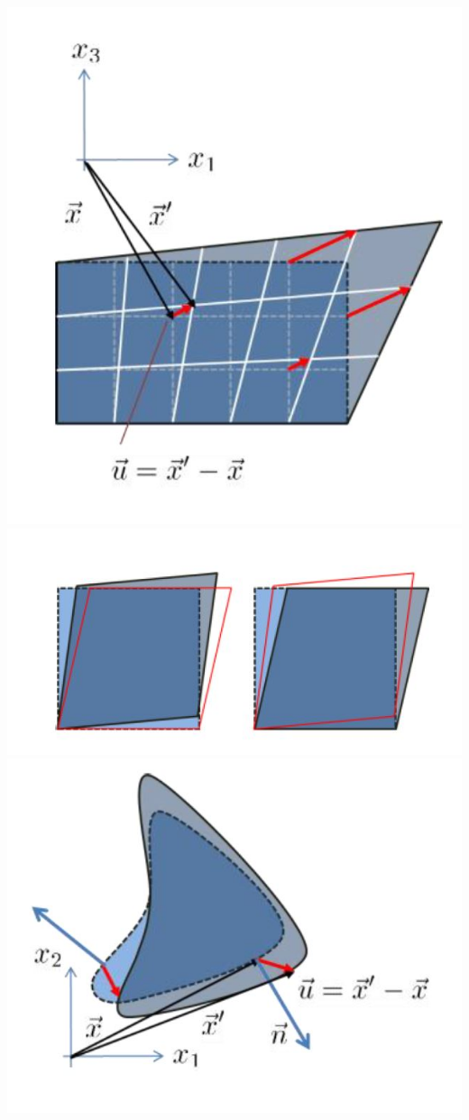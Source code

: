 		\includegraphics[scale=.3]{images/2Ddeformation}				
		\includegraphics[scale=.3]{images/deformgrad}
		\includegraphics[scale=.3]{images/deformvolume}
